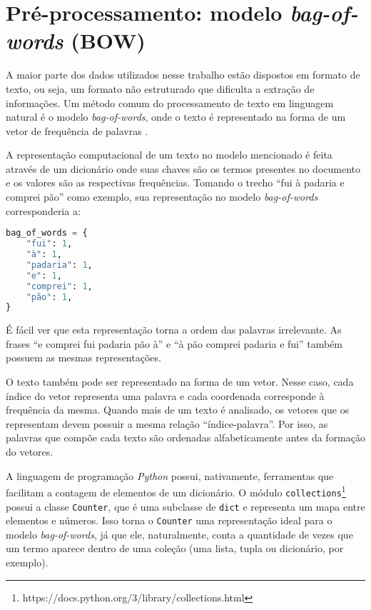 \section{Pré-processamento: modelo \textit{bag-of-words} (BOW)}
\label{sec:modelo_te}

A maior parte dos dados utilizados nesse trabalho estão dispostos em formato de texto, ou seja, um formato não estruturado que dificulta a extração de informações. Um método comum do processamento de texto em linguagem natural é o modelo \textit{bag-of-words}, onde o texto é representado na forma de um vetor de frequência de palavras \cite{pretext}.

A representação computacional de um texto no modelo mencionado é feita através de um dicionário onde suas chaves são os termos presentes no documento e os valores são as respectivas frequências. Tomando o trecho ``fui à padaria e comprei pão'' como exemplo, sua representação no modelo \textit{bag-of-words} corresponderia a:

\begin{lstlisting}[language=Python, caption=Representação de um trecho  no modelo bag-of-words]
bag_of_words = {
    "fui": 1,
    "à": 1,
    "padaria": 1,
    "e": 1,
    "comprei": 1,
    "pão": 1,
}
\end{lstlisting}

É fácil ver que esta representação torna a ordem das palavras irrelevante. As frases ``e comprei fui padaria pão à'' e ``à pão comprei padaria e fui'' também possuem as mesmas representações.

O texto também pode ser representado na forma de um vetor. Nesse caso, cada índice do vetor representa uma palavra e cada coordenada corresponde à frequência da mesma. Quando mais de um texto é analisado, os vetores que os representam devem possuir a mesma relação ``índice-palavra''. Por isso, as palavras que compõe cada texto são ordenadas alfabeticamente antes da formação do vetores.

A linguagem de programação \textit{Python} possui, nativamente, ferramentas que facilitam a contagem de elementos de um dicionário. O módulo \texttt{collections}\footnote{https://docs.python.org/3/library/collections.html} possui a classe \texttt{Counter}, que é uma subclasse de \texttt{dict} e representa um mapa entre elementos e números. Isso torna o \texttt{Counter} uma representação ideal para o modelo \textit{bag-of-words}, já que ele, naturalmente, conta a quantidade de vezes que um termo aparece dentro de uma coleção (uma lista, tupla ou dicionário, por exemplo).




